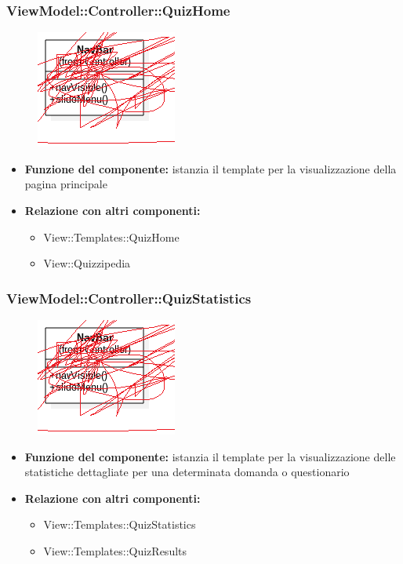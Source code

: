  \subsubsection{ViewModel::Controller::QuizHome}
 \begin{figure}[h!]
\begin{center}
	\includegraphics[scale=0.4]{../images/ViewModel/Controller/QuizHome.png}
\end{center}
\end{figure}
 \begin{itemize}
 \item\textbf{Funzione del componente:} istanzia il template per la visualizzazione della pagina principale
 \item\textbf{Relazione con altri componenti:}
 \begin{itemize} 
	\item View::Templates::QuizHome
	\item View::Quizzipedia
 \end{itemize}
 \end{itemize}
\newpage

 \subsubsection{ViewModel::Controller::QuizStatistics}
 \begin{figure}[h!]
\begin{center}
	\includegraphics[scale=0.4]{../images/ViewModel/Controller/QuizStatistics.png}
\end{center}
\end{figure}
  \begin{itemize}
 \item\textbf{Funzione del componente:} istanzia il template per la visualizzazione delle statistiche dettagliate per una determinata domanda o questionario
 \item\textbf{Relazione con altri componenti:}
 \begin{itemize}
		\item View::Templates::QuizStatistics
		\item View::Templates::QuizResults
 \end{itemize}
 \end{itemize}
\newpage

